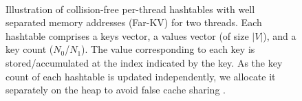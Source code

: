 \begin{figure}[hbtp]
  \centering
   \\[-2ex]
  \caption{Illustration of collision-free per-thread hashtables with well separated memory addresses (Far-KV) for two threads. Each hashtable comprises a keys vector, a values vector (of size $|V|$), and a key count ($N_0$/$N_1$). The value corresponding to each key is stored/accumulated at the index indicated by the key. As the key count of each hashtable is updated independently, we allocate it separately on the heap to avoid false cache sharing \cite{sahu2023gvelouvain}.}
  \label{fig:rak-hashtable}
\end{figure}
